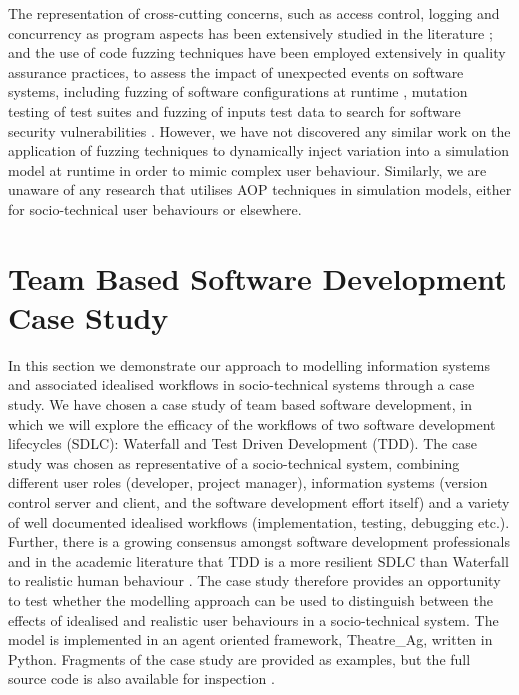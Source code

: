 \documentclass{llncs}
\begin{document}
The representation of cross-cutting concerns, such as access control, logging and concurrency as program aspects has
been extensively studied in the literature \citep{Ali2012Aspect}; and the use of code fuzzing techniques have been
employed extensively in quality assurance practices, to assess the impact of unexpected events on software systems,
including fuzzing of software configurations at runtime \citep{config_fuzzing}, mutation testing of test suites
\cite{demillo78hints} and fuzzing of inputs test data to search for software security vulnerabilities
\citep{takanen08fuzzing}.  However, we have not discovered any similar work on the application of fuzzing techniques to
dynamically inject variation into a simulation model at runtime in order to mimic complex user behaviour. Similarly, we
are unaware of any research that utilises AOP techniques in simulation models, either for socio-technical user
behaviours or elsewhere.


\section{Team Based Software Development Case Study}
\label{sec:case-study}


In this section we demonstrate our approach to modelling information systems and associated idealised workflows in
socio-technical systems through a case study.  We have chosen a case study of team based software development, in which
we will explore the efficacy of the workflows of two software development lifecycles (SDLC): Waterfall and Test Driven
Development (TDD).  The case study was chosen as representative of a socio-technical system, combining different user
roles (developer, project manager), information systems (version control server and client, and the software development
effort itself) and a variety of well documented idealised workflows (implementation, testing, debugging etc.).  Further,
there is a growing consensus amongst software development professionals and in the academic literature that TDD is a
more resilient SDLC than Waterfall to realistic human behaviour
\citep{Bhat2006TestDrivenDevelopment,George2004TestDrivenDevelopment,Huang2009EmpiricalTestFirstProgramming}.  The case
study therefore provides an opportunity to test whether the modelling approach can be used to distinguish between the
effects of idealised and realistic user behaviours in a socio-technical system.  The model is implemented in an agent
oriented framework, Theatre\_Ag, written in Python.  Fragments of the case study are provided as examples, but the full
source code is also available for inspection \cite{storer2016softdev-workflow-scm}.
\end{document}

